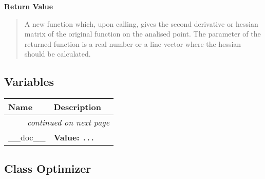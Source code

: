 \begin{boxedminipage}{\textwidth}
\begin{quote}
      \end{quote}

    \vspace{1ex}

      \textbf{Return Value}
      \begin{quote}

A new function which, upon calling, gives the second derivative or hessian
matrix of the original function on the analised point. The parameter of
the returned function is a real number or a line vector where the hessian
should be calculated.
      \end{quote}

    \vspace{1ex}

    \end{boxedminipage}



  \subsection{Variables}

\begin{longtable}{|p{}|p{}|l}
\cline{1-2}
\cline{1-2} \centering \textbf{Name} & \centering \textbf{Description}& \\
\cline{1-2}
\endhead\cline{1-2}\multicolumn{3}{r}{\small\textit{continued on next page}}\\\endfoot\cline{1-2}
\endlastfoot\raggedright \_\-\_\-d\-o\-c\-\_\-\_\- & \raggedright \textbf{Value:} 
{\tt \texttt{...}}&\\
\cline{1-2}
\end{longtable}



\subsection{Class Optimizer}

